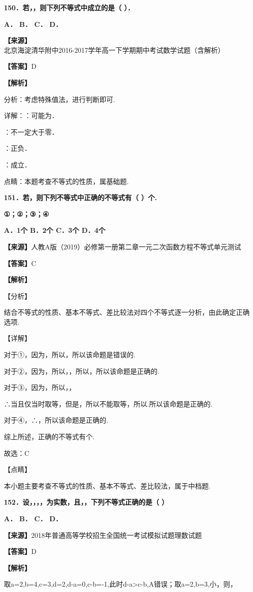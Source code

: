\documentclass[
]{article}
\begin{document}
\textbf{150．若，，则下列不等式中成立的是（ ）．}

\textbf{A． B． C． D．}

\textbf{【来源】}北京海淀清华附中2016-2017学年高一下学期期中考试数学试题（含解析）

\textbf{【答案】}D

\textbf{【解析】}

分析：考虑特殊值法，进行判断即可.

详解：：可能为．

：不一定大于零．

：正负．

：成立．

点睛：本题考查不等式的性质，属基础题.

\textbf{151．若，则下列不等式中正确的不等式有（ ）个.}

\textbf{①；②；③；④}

\textbf{A．1个 B．2个 C．3个 D．4个}

\textbf{【来源】}人教A版（2019）必修第一册第二章一元二次函数方程不等式单元测试

\textbf{【答案】}C

\textbf{【解析】}

【分析】

结合不等式的性质、基本不等式、差比较法对四个不等式逐一分析，由此确定正确选项.

【详解】

对于①，因为，所以，所以该命题是错误的.

对于②，因为，所以，，所以，所以该命题是正确的.

对于③，因为，所以，，

∴当且仅当时取等，但是，所以不能取等，所以.所以该命题是正确的.

对于④，∴，所以该命题是正确的.

综上所述，正确的不等式有个.

故选：C

【点睛】

本小题主要考查不等式的性质、基本不等式、差比较法，属于中档题.

\textbf{152．设，，，，为实数，且，，下列不等式正确的是（ ）}

\textbf{A． B． C． D．}

\textbf{【来源】}2018年普通高等学校招生全国统一考试模拟试题理数试题

\textbf{【答案】}D

\textbf{【解析】}

取a=2,b=4,c=3,d=2,d-a=0,c-b=-1,此时d-a\textgreater c-b,A错误；取a=2,b=3,小，则，
\end{document}
